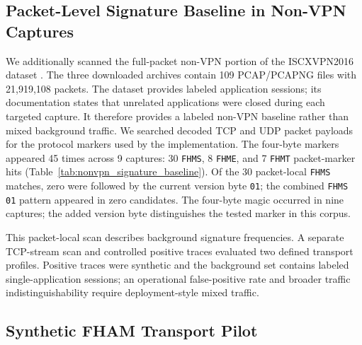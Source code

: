 \documentclass[preprint,12pt]{elsarticle}
\theoremstyle{plain}
\begin{document}
\begin{table}[!t]
\centering
\caption{H0/H1 Traffic Detectability by Envelope Mode (1920 Traces per Mode, 70/30 Train/Test Split)}
\label{tab:traffic_detectability}
{\small\setlength{\tabcolsep}{4pt}}
\end{table}

\subsection{Packet-Level Signature Baseline in Non-VPN Captures}

We additionally scanned the full-packet non-VPN portion of the ISCXVPN2016
dataset \cite{drapergil2016iscx,unbiscx2016}. The three downloaded archives
contain 109 PCAP/PCAPNG files with 21,919,108 packets. The dataset provides
labeled application sessions; its documentation states that unrelated
applications were closed during each targeted capture. It therefore provides
a labeled non-VPN baseline rather than mixed background traffic. We searched
decoded TCP and UDP packet payloads for the protocol markers used by the
implementation. The four-byte markers appeared 45 times across 9 captures:
30 \texttt{FHMS}, 8 \texttt{FHME}, and 7 \texttt{FHMT} packet-marker hits
(Table~\ref{tab:nonvpn_signature_baseline}). Of the 30 packet-local \texttt{FHMS} matches, zero were followed by the
current version byte \texttt{01}; the combined \texttt{FHMS\,01} pattern
appeared in zero candidates. The four-byte magic occurred in nine captures;
the added version byte distinguishes the tested marker in this corpus.

This packet-local scan describes background signature frequencies. A
separate TCP-stream scan and controlled positive traces evaluated two defined
transport profiles. Positive traces were synthetic and the background set
contains labeled single-application sessions; an operational false-positive
rate and broader traffic indistinguishability require deployment-style mixed
traffic.

\begin{table}[H]
\centering
\small
\caption{Packet-Local FHAM Marker Scan in the ISCXVPN2016 Non-VPN Captures}
\label{tab:nonvpn_signature_baseline}

\end{table}

\subsection{Synthetic FHAM Transport Pilot}
\end{document}
